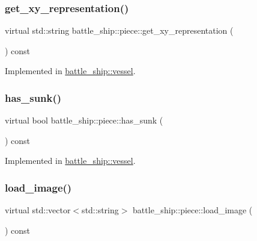 \subsubsection{\texorpdfstring{get\+\_\+xy\+\_\+representation()}{get\_xy\_representation()}}
{\footnotesize\ttfamily virtual std\+::string battle\+\_\+ship\+::piece\+::get\+\_\+xy\+\_\+representation (\begin{DoxyParamCaption}{ }\end{DoxyParamCaption}) const\hspace{0.3cm}{\ttfamily [pure virtual]}}



Implemented in \hyperlink{classbattle__ship_1_1vessel_a84bfaba9be4f15f6ec934c925d11967d}{battle\+\_\+ship\+::vessel}.

\mbox{\label{classbattle__ship_1_1piece_af22bd781f4206decd0beed89b014d1cc}} 
\subsubsection{\texorpdfstring{has\+\_\+sunk()}{has\_sunk()}}
{\footnotesize\ttfamily virtual bool battle\+\_\+ship\+::piece\+::has\+\_\+sunk (\begin{DoxyParamCaption}{ }\end{DoxyParamCaption}) const\hspace{0.3cm}{\ttfamily [pure virtual]}}



Implemented in \hyperlink{classbattle__ship_1_1vessel_a5f36d687fbb87ced436d2d88847a1d5c}{battle\+\_\+ship\+::vessel}.

\mbox{\label{classbattle__ship_1_1piece_aad848540970833ae5eadd115cc531b6b}} 
\subsubsection{\texorpdfstring{load\+\_\+image()}{load\_image()}}
{\footnotesize\ttfamily virtual std\+::vector$<$std\+::string$>$ battle\+\_\+ship\+::piece\+::load\+\_\+image (\begin{DoxyParamCaption}{ }\end{DoxyParamCaption}) const\hspace{0.3cm}{\ttfamily [pure virtual]}}



